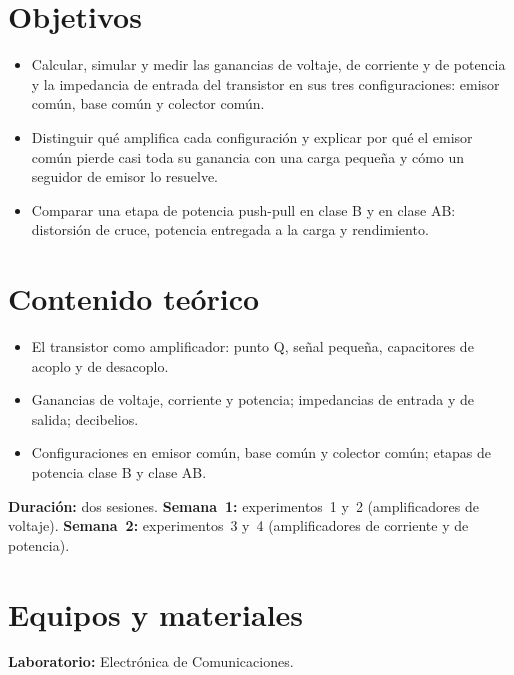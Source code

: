\documentclass[11pt,a4paper]{article}
\begin{document}
\section{Objetivos}
\begin{itemize}
    \item Calcular, simular y medir las ganancias de voltaje, de corriente y de potencia y la
          impedancia de entrada del transistor en sus tres configuraciones: emisor común, base
          común y colector común.
    \item Distinguir qué amplifica cada configuración y explicar por qué el emisor común
          pierde casi toda su ganancia con una carga pequeña y cómo un seguidor de emisor lo
          resuelve.
    \item Comparar una etapa de potencia push-pull en clase B y en clase AB: distorsión de
          cruce, potencia entregada a la carga y rendimiento.
\end{itemize}

\section{Contenido teórico}
\begin{itemize}
    \item El transistor como amplificador: punto Q, señal pequeña, capacitores de acoplo y de
          desacoplo.
    \item Ganancias de voltaje, corriente y potencia; impedancias de entrada y de salida;
          decibelios.
    \item Configuraciones en emisor común, base común y colector común; etapas de potencia
          clase B y clase AB.
\end{itemize}

\noindent\textbf{Duración:} dos sesiones. \textbf{Semana~1:} experimentos~1 y~2 (amplificadores
de voltaje). \textbf{Semana~2:} experimentos~3 y~4 (amplificadores de corriente y de
potencia).

\section{Equipos y materiales}
\noindent\textbf{Laboratorio:} Electrónica de Comunicaciones.
\end{document}
